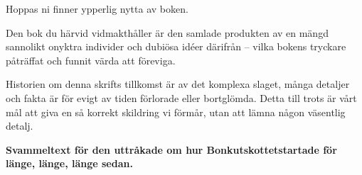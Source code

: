 Hoppas ni finner ypperlig nytta av boken.

\newpage



Den bok du härvid vidmakthåller är den samlade produkten av en mängd sannolikt onyktra individer och dubiösa idéer därifrån -- vilka bokens tryckare påträffat och funnit värda att föreviga.

Historien om denna skrifts tillkomst är av det komplexa slaget, många detaljer och fakta är för evigt av tiden förlorade eller bortglömda. Detta till trots är vårt mål att giva en så korrekt skildring vi förmår, utan att lämna någon väsentlig detalj.

\textbf{Svammeltext för den uttråkade om hur Bonkutskottetstartade för länge, länge, länge sedan.}

